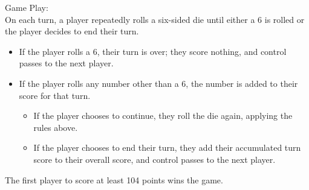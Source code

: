 \documentclass[a4paper,11pt]{article}
\begin{document}
\noindent
Game Play: \\
On each turn, a player repeatedly rolls a six-sided die until either a 6 is rolled or the player decides to end their turn. 
\begin{itemize}
    \item If the player rolls a 6, their turn is over; they score nothing, and control passes to the next player.
    \item If the player rolls any number other than a 6, the number is added to their score for that turn.
    \begin{itemize}
        \item If the player chooses to continue, they roll the die again, applying the rules above.
        \item If the player chooses to end their turn, they add their accumulated turn score to their overall score, and control passes to the next player.
    \end{itemize}
\end{itemize}

\noindent
The first player to score at least 104 points wins the game.\\
\end{document}
